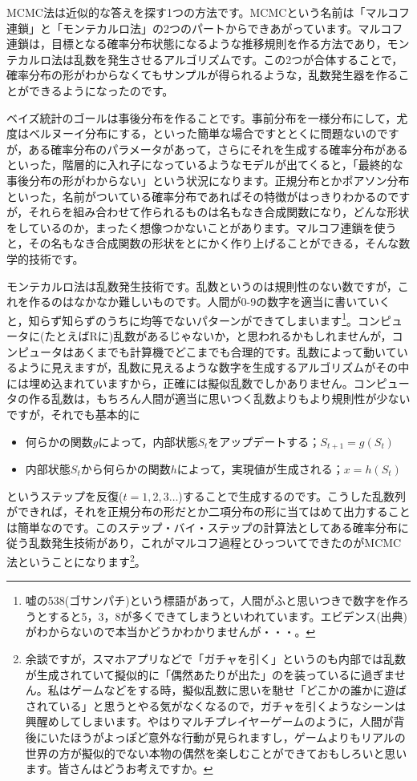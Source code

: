 \documentclass{ltjsbook}
\begin{document}
MCMC法は近似的な答えを探す1つの方法です。MCMCという名前は「マルコフ連鎖」と「モンテカルロ法」の2つのパートからできあがっています。マルコフ連鎖は，目標となる確率分布状態になるような推移規則を作る方法であり，モンテカルロ法は乱数を発生させるアルゴリズムです。この2つが合体することで，確率分布の形がわからなくてもサンプルが得られるような，乱数発生器を作ることができるようになったのです。

ベイズ統計のゴールは事後分布を作ることです。事前分布を一様分布にして，尤度はベルヌーイ分布にする，といった簡単な場合ですととくに問題ないのですが，ある確率分布のパラメータがあって，さらにそれを生成する確率分布があるといった，階層的に入れ子になっているようなモデルが出てくると，「最終的な事後分布の形がわからない」という状況になります。正規分布とかポアソン分布といった，名前がついている確率分布であればその特徴がはっきりわかるのですが，それらを組み合わせて作られるものは名もなき合成関数になり，どんな形状をしているのか，まったく想像つかないことがあります。マルコフ連鎖を使うと，その名もなき合成関数の形状をとにかく作り上げることができる，そんな数学的技術です。

モンテカルロ法は乱数発生技術です。乱数というのは規則性のない数ですが，これを作るのはなかなか難しいものです。人間が0-9の数字を適当に書いていくと，知らず知らずのうちに均等でないパターンができてしまいます\footnote{嘘の538(ゴサンパチ)という標語があって，人間がふと思いつきで数字を作ろうとすると5，3，8が多くできてしまうといわれています。エビデンス(出典)がわからないので本当かどうかわかりませんが・・・。}。コンピュータに(たとえばRに)乱数があるじゃないか，と思われるかもしれませんが，コンピュータはあくまでも計算機でどこまでも合理的です。乱数によって動いているように見えますが，乱数に見えるような数字を生成するアルゴリズムがその中には埋め込まれていますから，正確には擬似乱数でしかありません。コンピュータの作る乱数は，もちろん人間が適当に思いつく乱数よりもより規則性が少ないですが，それでも基本的に
\begin{itemize}
	\item 何らかの関数$g$によって，内部状態$S_t$をアップデートする；$S_{t+1}=g(S_t)$
	\item 内部状態$S_t$から何らかの関数$h$によって，実現値が生成される；$x = h(S_t)$
\end{itemize}
というステップを反復($t=1,2,3\ldots$)することで生成するのです。こうした乱数列ができれば，それを正規分布の形だとか二項分布の形に当てはめて出力することは簡単なのです。このステップ・バイ・ステップの計算法としてある確率分布に従う乱数発生技術があり，これがマルコフ過程とひっついてできたのがMCMC法ということになります\footnote{余談ですが，スマホアプリなどで「ガチャを引く」というのも内部では乱数が生成されていて擬似的に「偶然あたりが出た」のを装っているに過ぎません。私はゲームなどをする時，擬似乱数に思いを馳せ「どこかの誰かに遊ばされている」と思うとやる気がなくなるので，ガチャを引くようなシーンは興醒めしてしまいます。やはりマルチプレイヤーゲームのように，人間が背後にいたほうがよっぽど意外な行動が見られますし，ゲームよりもリアルの世界の方が擬似的でない本物の偶然を楽しむことができておもしろいと思います。皆さんはどうお考えですか。}。
\end{document}
